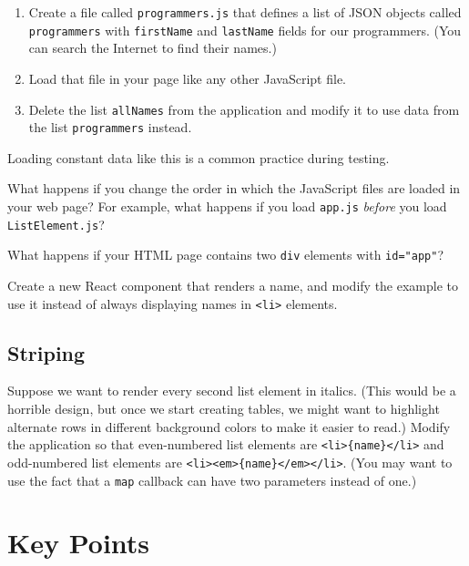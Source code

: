 
\begin{enumerate}
\item
  Create a file called \texttt{programmers.js} that defines
  a list of JSON objects called \texttt{programmers}
  with \texttt{firstName} and \texttt{lastName} fields for our programmers.
  (You can search the Internet to find their names.)
\item
  Load that file in your page like any other JavaScript file.
\item
  Delete the list \texttt{allNames} from the application
  and modify it to use data from the list \texttt{programmers} instead.
\end{enumerate}

Loading constant data like this is a common practice during testing.


What happens if you change the order in which the JavaScript files
are loaded in your web page?
For example,
what happens if you load \texttt{app.js} \emph{before} you load \texttt{ListElement.js}?


What happens if your HTML page contains two \texttt{div} elements with \texttt{id="app"}?


Create a new React component that renders a name,
and modify the example to use it instead of always displaying names in \texttt{{\textless}li{\textgreater}{}} elements.

\subsection*{Striping}
Suppose we want to render every second list element in italics.
(This would be a horrible design,
but once we start creating tables,
we might want to highlight alternate rows in different background colors
to make it easier to read.)
Modify the application so that
even-numbered list elements are \texttt{{\textless}li{\textgreater}{}\{name\}{\textless}/li{\textgreater}{}}
and odd-numbered list elements are \texttt{{\textless}li{\textgreater}{}{\textless}em{\textgreater}{}\{name\}{\textless}/em{\textgreater}{}{\textless}/li{\textgreater}{}}.
(You may want to use the fact that a \texttt{map} callback can have two parameters
instead of one.)

\section*{Key Points}


